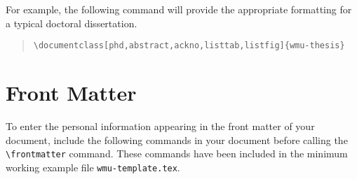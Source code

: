 \documentclass{wmu-thesis}
\begin{document}
For example, the following command will provide the appropriate formatting for a typical doctoral dissertation.
\begin{quote}
\begin{verbatim}
\documentclass[phd,abstract,ackno,listtab,listfig]{wmu-thesis}
\end{verbatim}
\end{quote}

\section*{Front Matter}
To enter the personal information appearing in the front matter of your document, include the following commands in your document before calling the  \verb|\frontmatter| command.  These commands have been included in the minimum working example file \texttt{wmu-template.tex}.%
\end{document}
